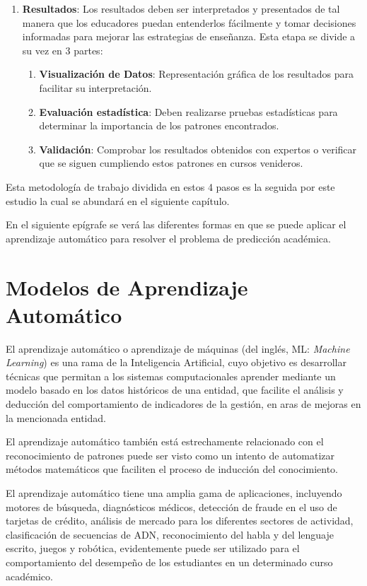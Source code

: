\begin{enumerate}
    \item \textbf{Resultados}: Los resultados deben ser interpretados y presentados de tal manera que los educadores puedan entenderlos fácilmente y tomar decisiones informadas para mejorar las estrategias de enseñanza. Esta etapa se divide a su vez en 3 partes:
    \begin{enumerate}
        \item \textbf{Visualización de Datos}: Representación gráfica de los resultados para facilitar su interpretación.
        \item \textbf{Evaluación estadística}: Deben realizarse pruebas estadísticas para determinar la importancia de los patrones encontrados.
        \item \textbf{Validación}: Comprobar los resultados obtenidos con expertos o verificar que se siguen cumpliendo estos patrones en cursos venideros.
    \end{enumerate} 

\end{enumerate}
Esta metodología de trabajo dividida en estos 4 pasos es la seguida por este estudio la cual se abundará en el siguiente capítulo.  

En el siguiente epígrafe se verá las diferentes formas en que se puede aplicar el aprendizaje automático para resolver el problema de predicción académica.  

\section{Modelos de Aprendizaje Automático}

El aprendizaje automático o aprendizaje de máquinas (del inglés, ML: \textit{Machine Learning}) es una rama de la Inteligencia Artificial, cuyo objetivo es desarrollar técnicas que permitan a los sistemas computacionales aprender mediante un modelo basado en los datos históricos de una entidad, que facilite el análisis y deducción del comportamiento de indicadores de la gestión, en aras de mejoras en la mencionada entidad.  


El aprendizaje automático también está estrechamente relacionado con el reconocimiento de patrones puede ser visto como un intento de automatizar métodos matemáticos que faciliten el proceso de inducción del conocimiento.  


El aprendizaje automático tiene una amplia gama de aplicaciones, incluyendo motores de búsqueda, diagnósticos médicos, detección de fraude en el uso de tarjetas de crédito, análisis de mercado para los diferentes sectores de actividad, clasificación de secuencias de ADN, reconocimiento del habla y del lenguaje escrito, juegos y robótica, evidentemente puede ser utilizado para el comportamiento del desempeño de los estudiantes en un determinado curso académico.  


